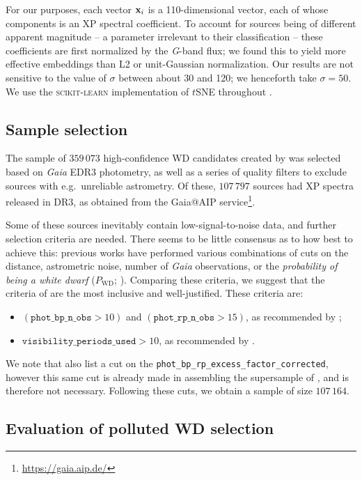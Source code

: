 \documentclass[fleqn,usenatbib]{rasti}
\newcommand{\Pwd}{P_\mathrm{WD}}
\newcommand\xb{\vb{x}}
\begin{document}
For our purposes, each vector $\xb_i$ is a 110-dimensional vector, each of whose components is an XP spectral coefficient.
To account for sources being of different apparent magnitude -- a parameter irrelevant to their classification -- these coefficients are first normalized by the \textit{G}-band flux; we found this to yield more effective embeddings than L2 or unit-Gaussian normalization.
Our results are not sensitive to the value of $\sigma$ between about 30 and 120; we henceforth take $\sigma=50$.
We use the \textsc{scikit-learn} implementation of $t$SNE throughout \citep{sklearn}.


\subsection{Sample selection}
The sample of $359\,073$ high-confidence WD candidates created by \citet{gentilefusillo21} was selected based on \textit{Gaia} EDR3 photometry, as well as a series of quality filters to exclude sources with e.g.\ unreliable astrometry.
Of these, $107\,797$ sources had XP spectra released in DR3, as obtained from the Gaia@AIP service\footnote{
    \url{https://gaia.aip.de/}
}.

Some of these sources inevitably contain low-signal-to-noise data, and further selection criteria are needed.
There seems to be little consensus as to how best to achieve this: previous works have performed various combinations of cuts on the distance, astrometric noise, number of \textit{Gaia} observations, or the \textit{probability of being a white dwarf} ($\Pwd$; \citealt{gentilefusillo15}).
Comparing these criteria, we suggest that the criteria of \citet{perezcouto24} are the most inclusive and well-justified.
These criteria are:
\begin{itemize}
\item $(\texttt{phot\_bp\_n\_obs} > 10)$ and $(\texttt{phot\_rp\_n\_obs} > 15)$, as recommended by \citet{andrae23};
\item $\texttt{visibility\_periods\_used} > 10$, as recommended by \citet{lindegren18}.
\end{itemize}
We note that \citet{perezcouto24} also list a cut on the \texttt{phot\_bp\_rp\_excess\_factor\_corrected}, however this same cut is already made in assembling the supersample of \citet[][their equation 21]{gentilefusillo21}, and is therefore not necessary.
Following these cuts, we obtain a sample of size $107\,164$.


\subsection{Evaluation of polluted WD selection} \label{sec:evaluation}
\end{document}
